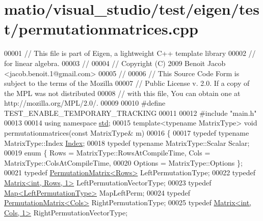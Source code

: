 \hypertarget{matio_2visual__studio_2test_2eigen_2test_2permutationmatrices_8cpp_source}{}\section{matio/visual\+\_\+studio/test/eigen/test/permutationmatrices.cpp}
\label{matio_2visual__studio_2test_2eigen_2test_2permutationmatrices_8cpp_source}

\begin{DoxyCode}
00001 \textcolor{comment}{// This file is part of Eigen, a lightweight C++ template library}
00002 \textcolor{comment}{// for linear algebra.}
00003 \textcolor{comment}{//}
00004 \textcolor{comment}{// Copyright (C) 2009 Benoit Jacob <jacob.benoit.1@gmail.com>}
00005 \textcolor{comment}{//}
00006 \textcolor{comment}{// This Source Code Form is subject to the terms of the Mozilla}
00007 \textcolor{comment}{// Public License v. 2.0. If a copy of the MPL was not distributed}
00008 \textcolor{comment}{// with this file, You can obtain one at http://mozilla.org/MPL/2.0/.}
00009 
00010 \textcolor{preprocessor}{#define TEST\_ENABLE\_TEMPORARY\_TRACKING}
00011   
00012 \textcolor{preprocessor}{#include "main.h"}
00013 
00014 \textcolor{keyword}{using namespace }\hyperlink{namespacestd}{std};
00015 \textcolor{keyword}{template}<\textcolor{keyword}{typename} MatrixType> \textcolor{keywordtype}{void} permutationmatrices(\textcolor{keyword}{const} MatrixType& m)
00016 \{
00017   \textcolor{keyword}{typedef} \textcolor{keyword}{typename} MatrixType::Index \hyperlink{namespace_eigen_a62e77e0933482dafde8fe197d9a2cfde}{Index};
00018   \textcolor{keyword}{typedef} \textcolor{keyword}{typename} MatrixType::Scalar Scalar;
00019   \textcolor{keyword}{enum} \{ Rows = MatrixType::RowsAtCompileTime, Cols = MatrixType::ColsAtCompileTime,
00020          Options = MatrixType::Options \};
00021   \textcolor{keyword}{typedef} \hyperlink{group___core___module_class_eigen_1_1_permutation_matrix}{PermutationMatrix<Rows>} LeftPermutationType;
00022   \textcolor{keyword}{typedef} \hyperlink{group___core___module_class_eigen_1_1_matrix}{Matrix<int, Rows, 1>} LeftPermutationVectorType;
00023   \textcolor{keyword}{typedef} \hyperlink{group___core___module_class_eigen_1_1_map}{Map<LeftPermutationType>} MapLeftPerm;
00024   \textcolor{keyword}{typedef} \hyperlink{group___core___module_class_eigen_1_1_permutation_matrix}{PermutationMatrix<Cols>} RightPermutationType;
00025   \textcolor{keyword}{typedef} \hyperlink{group___core___module_class_eigen_1_1_matrix}{Matrix<int, Cols, 1>} RightPermutationVectorType;

\end{DoxyCode}
